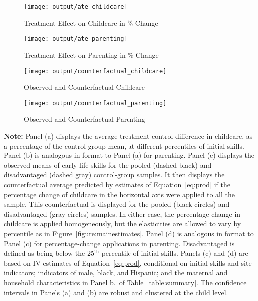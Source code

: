 \begin{sidewaysfigure}
\centering
\caption{Counterfactual Estimates: Imputing Treatment Effects Across the Distribution of Initial Skills} \label{figure:counterfactuals}
\begin{subfigure}[h]{0.4\textwidth}
	\centering
	\caption{Treatment Effect on Childcare in \% Change}  
	\texttt{[image: output/ate\_childcare]}
\end{subfigure}
\begin{subfigure}[h]{0.4\textwidth}
	\centering
	\caption{Treatment Effect on Parenting in \% Change} 
	\texttt{[image: output/ate\_parenting]}
\end{subfigure}

\begin{subfigure}[h]{0.4\textwidth}
	\centering
	\caption{Observed and Counterfactual Childcare}  
	\texttt{[image: output/counterfactual\_childcare]}
\end{subfigure}
\begin{subfigure}[h]{0.4\textwidth}
	\centering
	\caption{Observed and Counterfactual Parenting}  
	\texttt{[image: output/counterfactual\_parenting]}
\end{subfigure}
\footnotesize
\justify
\textbf{Note:} Panel (a) displays the average treatment-control difference in childcare, as a percentage of the control-group mean, at different percentiles of initial skills. Panel (b) is analogous in format to Panel (a) for parenting. Panel (c) displays the observed means of early life skills for the pooled (dashed black) and disadvantaged (dashed gray) control-group samples. It then displays the counterfactual average predicted by estimates of Equation~\eqref{eq:prod} if the percentage change of childcare in the horizontal axis were applied to all the sample. This counterfactual is displayed for the pooled (black circles) and disadvantaged (gray circles) samples. In either case, the percentage change in childcare is applied homogeneously, but the elasticities are allowed to vary by percentile as in Figure~\ref{figure:mainestimates}. Panel (d) is analogous in format to Panel (c) for percentage-change applications in parenting. Disadvantaged is defined as being below the 25$^\text{th}$ percentile of initial skills. Panels (c) and (d) are based on IV estimates of Equation~\eqref{eq:prod}, conditional on initial skills and site indicators; indicators of male, black, and Hispanic; and the maternal and household characteristics in Panel b.\ of Table~\ref{table:summary}. The confidence intervals in Panels (a) and (b) are robust and clustered at the child level.
\end{sidewaysfigure}


